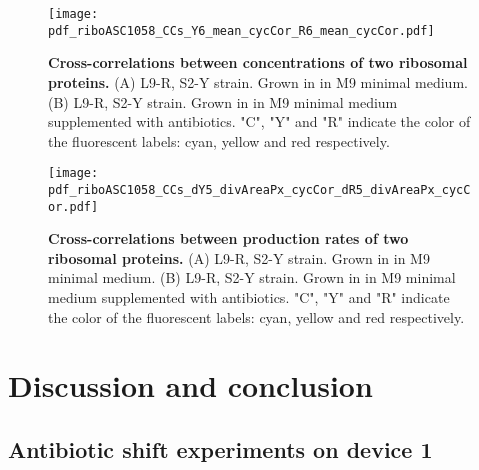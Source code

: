 

\begin{figure}
    \centering
    \texttt{[image: pdf\_riboASC1058\_CCs\_Y6\_mean\_cycCor\_R6\_mean\_cycCor.pdf]}
    \caption{ 
        \textbf{Cross-correlations between concentrations of two ribosomal proteins.}
        (A) L9-R, S2-Y strain. Grown in in M9 minimal medium.
        (B) L9-R, S2-Y strain. Grown in in M9 minimal medium supplemented with antibiotics.
        "C", "Y" and "R" indicate the color of the fluorescent labels: cyan, yellow and red respectively.
    }
    \label{fig:ribo:CCsEERiboribo}
\end{figure}

\begin{figure}
    \centering
    \texttt{[image: pdf\_riboASC1058\_CCs\_dY5\_divAreaPx\_cycCor\_dR5\_divAreaPx\_cycCor.pdf]}
    \caption{ 
        \textbf{Cross-correlations between production rates of two ribosomal proteins.}
        (A) L9-R, S2-Y strain. Grown in in M9 minimal medium.
        (B) L9-R, S2-Y strain. Grown in in M9 minimal medium supplemented with antibiotics.
        "C", "Y" and "R" indicate the color of the fluorescent labels: cyan, yellow and red respectively.
    }
    \label{fig:ribo:CCsPPRiboribo}
\end{figure}




\section{Discussion and conclusion}


\subsection{Antibiotic shift experiments on device 1}

